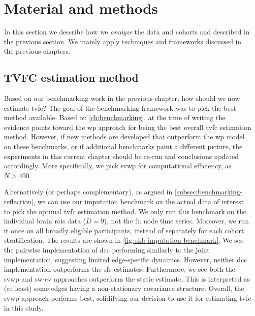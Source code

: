 \clearpage
\section{Material and methods}
\label{sec:ukb-methodology}

In this section we describe how we \emph{analyze} the data and cohorts and described in the previous section.
We mainly apply techniques and frameworks discussed in the previous chapters.

\subsection{TVFC estimation method}

Based on our benchmarking work in the previous chapter, how should we now estimate \gls{tvfc}?
The goal of the benchmarking framework was to pick the best method available.
Based on \cref{ch:benchmarking}, at the time of writing the evidence points toward the \gls{wp} approach for being the best overall \gls{tvfc} estimation method.
However, if new methods are developed that outperform the \gls{wp} model on these benchmarks, or if additional benchmarks paint a different picture, the experiments in this current chapter should be re-run and conclusions updated accordingly.
More specifically, we pick \gls{svwp} for computational efficiency, as $N > 400$.

Alternatively (or perhaps complementary), as argued in \cref{subsec:benchmarking-reflection}, we can use our imputation benchmark on the actual data of interest to pick the optimal \gls{tvfc} estimation method.
We only run this benchmark on the individual brain \glspl{roi} data ($D = 9$), not the \gls{fn} node time series.
Moreover, we run it once on all broadly eligible participants, instead of separately for each cohort stratification.
%
The results are shown in \cref{fig:ukb-imputation-benchmark}.
We see the pairwise implementation of \gls{dcc} performing similarly to the joint implementation, suggesting limited edge-specific dynamics.
However, neither \gls{dcc} implementation outperforms the \gls{sfc} estimates.
Furthermore, we see both the \gls{svwp} and \gls{sw-cv} approaches outperform the static estimate.
This is interpreted as (at least) some edges having a non-stationary covariance structure.
Overall, the \gls{svwp} approach performs best, solidifying our decision to use it for estimating \gls{tvfc} in this study.


